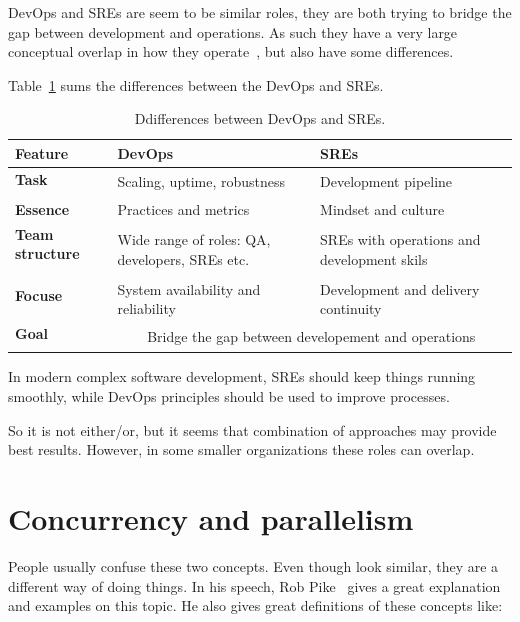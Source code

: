\noindent
DevOps and SREs are seem to be similar roles, they are both trying to bridge the gap between development and operations. As such they have a very large conceptual overlap in how they operate~\cite{46939}, but also have some differences. 

Table~\ref{tab:table10} sums the differences between the DevOps and SREs.

\begin{table}[H]
	\begin{center}
		\begin{tabular}{l|l|l}
			\textbf{Feature} & \textbf{DevOps} & \textbf{SREs}\\
			\hline
			\textbf{Task} & \multirow{2}{10em}{Scaling, uptime, robustness} & \multirow{2}{10em}{Development pipeline} \\
			& & \\
			\textbf{Essence} & Practices and metrics &  Mindset and culture \\
			\textbf{Team structure} & \multirow{3}{10em}{Wide range of roles: QA, developers, SREs etc.} &  \multirow{3}{10em}{SREs with operations and development skils} \\
			&  &  \\
			&  &  \\
			\textbf{Focuse} & \multirow{2}{10em}{System availability and reliability} & \multirow{2}{10em}{Development and delivery continuity} \\
			&  &  \\
			\hline
			\textbf{Goal} & \multicolumn{2}{c}{\multirow{2}{15em}{Bridge the gap between developement and operations}} \\
			&  &  \\
		\end{tabular}
	\end{center}
	\vspace{-0.5cm}
	\caption{Ddifferences between DevOps and SREs.}
	\label{tab:table10}
\end{table}

\noindent
In modern complex software development, SREs should keep things running smoothly, while DevOps principles should be used to improve processes. 

So it is not either/or, but it seems that combination of approaches may provide best results. However, in some smaller organizations these roles can overlap.
%
%
\section{Concurrency and parallelism}\label{sec:concurency_parallelism}
%
People usually confuse these two concepts. Even though look similar, they are a different way of doing things. In his speech, Rob Pike~\cite{Pike} gives a great explanation and examples on this topic. He also gives great definitions of these concepts like:


